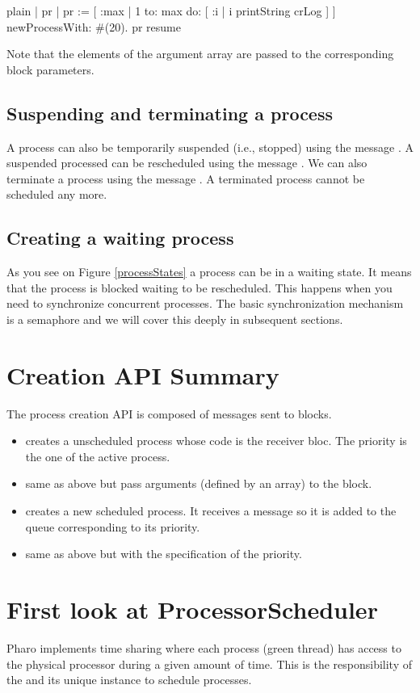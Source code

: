 \documentclass[10pt,twoside,english]{_support/latex/sbabook/sbabook}
\begin{document}
\begin{displaycode}{plain}
| pr |
pr := [ :max |
  1 to: max do: [ :i |
    i  printString crLog ] ] newProcessWith: #(20).
pr resume
\end{displaycode}

Note that the elements of the argument array are passed to the corresponding block parameters.
\subsection{Suspending and terminating a process}
A process can also be temporarily suspended (i.e., stopped) using the message . 
A suspended processed can be rescheduled using the message . 
We can also terminate a process using the message . 
A terminated process cannot be scheduled any more.
\subsection{Creating a waiting process}
As you see on Figure \ref{processStates} a process can be in a waiting state.
It means that the process is blocked waiting to be rescheduled. 
This happens when you need to synchronize concurrent processes.
The basic synchronization mechanism is a semaphore and we will cover this deeply in subsequent sections.
\section{Creation API Summary}
The process creation API is composed of messages sent to blocks. 

\begin{itemize}
\item {} creates a unscheduled process whose code is the receiver bloc. The priority is the one of the active process. 
\item {}  same as above but pass arguments (defined by an array) to the block.
\item {} creates a new scheduled process. It receives a  message so it is added to the queue corresponding to its priority. 
\item {} same as above but with the specification of the priority. 
\end{itemize}
\section{First look at ProcessorScheduler}
Pharo implements time sharing where each process (green thread) has access to the physical processor during a given amount of time. 
This is the responsibility of the  and its unique instance  to schedule processes. 
\end{document}
